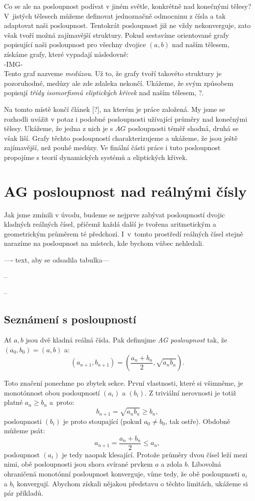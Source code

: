\documentclass[12pt]{report}
\begin{document}
Co se ale na posloupnost podívat v jiném světle, konkrétně nad konečnými tělesy? V~jistých tělesech můžeme definovat jednoznačně  odmocninu z čísla a tak adaptovat naši posloupnost. Tentokrát posloupnost již ne vždy nekonverguje, zato však tvoří možná zajímavější struktury. Pokud sestavíme orientované grafy popisující naši posloupnost pro všechny dvojice $(a,b)$ nad naším tělesem, získáme grafy, které vypadají následovně:\\
-IMG-\\
Tento graf nazveme \textit{medúzou}. Už to, že grafy tvoří takovéto struktury je pozoruhodné, medúzy ale zde zdaleka nekončí. Ukážeme, že svým způsobem popisují \textit{třídy isomorfismů eliptických křivek} nad naším tělesem, ?. 

Na tomto místě končí článek [?], na kterém je práce založená. My jsme se rozhodli uvážit v potaz i podobné posloupnosti užívající průměry nad konečnými tělesy. Ukážeme, že jedna z nich je s $AG$ posloupnosti téměř shodná, druhá se však liší. Grafy těchto posloupností charakterizujeme a ukážeme, že jsou ještě zajímavější, než pouhé medúzy. Ve finální části práce i tuto posloupnost propojíme s teorií dynamických systémů a eliptických křivek.

\chapter{AG posloupnost nad reálnými čísly}


Jak jsme zmínili v úvodu, budeme se nejprve zabývat posloupností dvojic kladných reálných čísel, přičemž každá další je tvořena aritmetickým a geometrickým průměrem té předchozí. I~v~tomto  prostředí reálných čísel stejně narazíme na posloupnost na místech, kde bychom vůbec nehledali.

---- text, aby se odsadila tabulka---

--

--
\section{Seznámení s posloupností}


\begin{definice}
Ať $a,b$ jsou dvě kladná reálná čísla. Pak definujme \textit{AG posloupnost} tak, že $(a_0,b_0) = (a,b)$ a:
$$\left(a_{n+1},b_{n+1} \right) = \left(\frac{a_n+b_n}{2}, \sqrt{a_n b_n} \right).$$
\end{definice}

Toto značení ponechme po zbytek sekce. První vlastnosti, které si všimněme, je monotónnost obou posloupností $(a_i)$ a $(b_i)$. Z triviální nerovnosti je totiž platné $a_n \geqslant b_n$ a~proto:
$$ b_{n+1} = \sqrt{a_n b_n} \geqslant b_n,$$
posloupnosti $(b_i)$ je proto stoupající (pokud $a_0 \neq b_0$, tak ostře). Obdobně  můžeme psát:
$$a_{n+1} = \frac{a_n+b_n}{2} \leqslant a_n,$$
posloupnost $(a_i)$ je tedy naopak klesající. Protože průměry dvou čísel leží mezi nimi, obě posloupnosti jsou shora svírané prvkem $a$ a zdola $b$. Libovolná ohraničená monotónní posloupnost konverguje, víme tedy, že obě posloupnosti $a_i$ a $b_i$ konvergují. Abychom získali nějakou představu o těchto limitách, ukážeme si pár příkladů.
\end{document}

